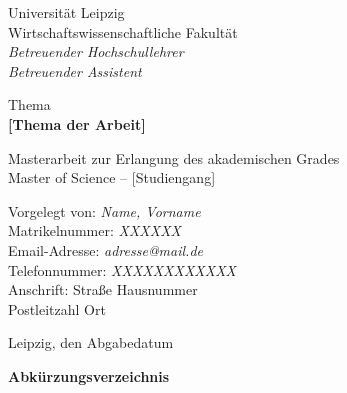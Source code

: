 \documentclass[a4paper,12pt]{article}
\begin{document}
\begin{titlepage}
{{ \noindent  Universität Leipzig\\
		Wirtschaftswissenschaftliche Fakultät\\
		\itshape Betreuender Hochschullehrer\\
		Betreuender Assistent\\	 \par}
	\vspace{2cm}
	{\centering  Thema \\
	\bfseries \large [Thema der Arbeit]\par}
	\vspace{2cm}
	{ \centering  Masterarbeit zur Erlangung des akademischen Grades\\
	     Master of Science – [Studiengang] 
		\par}

	\vfill}

	{\noindent Vorgelegt von: \textit{Name, Vorname } \\
	 Matrikelnummer: \textit{XXXXXX} \\
	 Email-Adresse: \textit{adresse@mail.de} \\
	 Telefonnummer: \textit{XXXXXXXXXXXX} \\
	 Anschrift:  {Straße Hausnummer\\
						\hspace*{2.15cm} Postleitzahl Ort } \\ } 
		
		{\noindent  Leipzig, den Abgabedatum\par}
\end{titlepage}


\tableofcontents
\newpage

\listoffigures
\newpage

{\noindent\Large\bfseries Abkürzungsverzeichnis}
\begin{acronym}
\end{acronym} 
\newpage


\listoftables
\newpage
\clearpage
\end{document}
